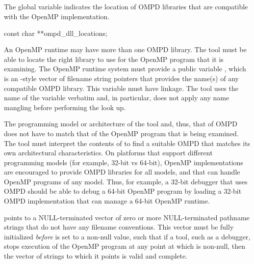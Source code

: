 \subsection{}
\label{subsubsec:ompd_dll_locations}

\summary
The  global variable indicates the location
of OMPD libraries that are compatible with the OpenMP implementation.

\format
\begin{cspecific}
\begin{ompSyntax}
const char **ompd_dll_locations;
\end{ompSyntax}
\end{cspecific}

\descr
An OpenMP runtime may have more than one OMPD library. The tool must be able 
to locate the right library to use for the OpenMP program that it is examining.
The OpenMP runtime system must provide a public variable ,
which is an -style vector of filename string pointers that provides 
the name(s) of any compatible OMPD library. This variable must have  
linkage. The tool uses the name of the variable verbatim and, in particular, 
does not apply any name mangling before performing the look up.

The programming model or architecture of the tool and, thus, that of OMPD does 
not have to match that of the OpenMP program that is being examined. The tool
must interpret the contents of  to find a suitable OMPD 
that matches its own architectural characteristics. On platforms that support 
different programming models (for example, 32-bit vs 64-bit), OpenMP 
implementations are encouraged to provide OMPD libraries for all models, and 
that can handle OpenMP programs of any model. Thus, for example, a 32-bit 
debugger that uses OMPD should be able to debug a 64-bit OpenMP program by 
loading a 32-bit OMPD implementation that can manage a 64-bit OpenMP runtime.

 points to a NULL-terminated vector of zero or more 
NULL-terminated pathname strings that do not have any filename conventions. 
This vector must be fully initialized \emph{before}  
is set to a non-null value, such that if a tool, such as a debugger, stops 
execution of the OpenMP program at any point at which  
is non-null, then the vector of strings to which it points is valid and complete.

